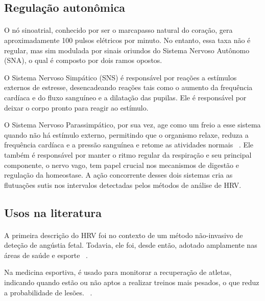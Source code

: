         \subsection {Regulação autonômica}
        
        \paragraph{} O nó sinoatrial, conhecido por ser o marcapasso natural do coração, gera aproximadamente 100 pulsos elétricos por minuto. No entanto, essa taxa não é regular, mas sim modulada por sinais oriundos do Sistema Nervoso Autônomo (SNA), o qual é composto por dois ramos opostos. 
        
        O Sistema Nervoso Simpático (SNS) é responsável por reações a estímulos externos de estresse, desencadeando reações tais como o aumento da frequência cardíaca e do fluxo sanguíneo e a dilatação das pupilas. Ele é responsável por deixar o corpo pronto para reagir ao estímulo. 
        
        O Sistema Nervoso Parassimpático, por sua vez, age como um freio a esse sistema quando não há estímulo externo, permitindo que o organismo relaxe, reduza a frequência cardíaca e a pressão sanguínea e retome as atividades normais ~\cite{Oweis2014QRSSurvey}. Ele também é responsável por manter o ritmo regular da respiração e seu principal componente, o nervo vago, tem papel crucial nos mecanismos de digestão e regulação da homeostase. A ação concorrente desses dois sistemas cria as flutuações sutis nos intervalos detectadas pelos métodos de análise de HRV.
      
        \subsection {Usos na literatura}
        
            \paragraph{} A primeira descrição do HRV foi no contexto de um método não-invasivo de  deteção de angústia fetal. Todavia, ele foi, desde então, adotado amplamente nas áreas de saúde e esporte ~\cite{Quintana2016GuidelinesCommunication}. 
            
            Na medicina esportiva, é usado para monitorar a recuperação de atletas, indicando quando estão ou não aptos a realizar treinos mais pesados, o que reduz a probabilidade de lesões. ~\cite{Oweis2014QRSSurvey, Plews2017ComparisonMethods, Shaffer2017AnNorms.}. 
            
